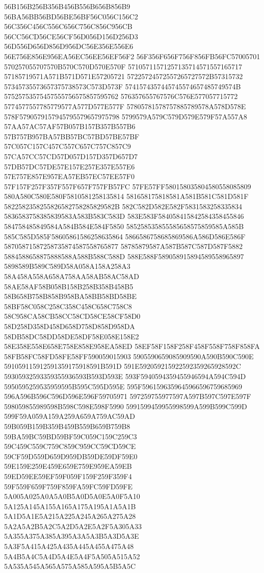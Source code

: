56B156B256B356B456B556B656B856B9
56BA56BB56BD56BE56BF56C056C156C2
56C356C456C556C656C756C856C956CB
56CC56CD56CE56CF56D056D156D256D3
56D556D656D856D956DC56E356E556E6
56E756E856E956EA56EC56EE56EF56F2
56F356F656F756F856FB56FC57005701
570257055707570B570C570D570E570F
57105711571257135714571557165717
57185719571A571B571D571E57205721
57225724572557265727572B57315732
57345735573657375738573C573D573F
5741574357445745574657485749574B
57525753575457555756575857595762
576357655767576C576E577057715772
5774577557785779577A577D577E577F
57805781578757885789578A578D578E
578F5790579157945795579657975798
5799579A579C579D579E579F57A557A8
57AA57AC57AF57B057B157B357B557B6
57B757B957BA57BB57BC57BD57BE57BF
57C057C157C457C557C657C757C857C9
57CA57CC57CD57D057D157D357D657D7
57DB57DC57DE57E157E257E357E557E6
57E757E857E957EA57EB57EC57EE57F0
57F157F257F357F557F657F757FB57FC
57FE57FF580158035804580558085809
580A580C580E580F5810581258135814
581658175818581A581B581C581D581F
5822582358255826582758285829582B
582C582D582E582F5831583258335834
5836583758385839583A583B583C583D
583E583F584058415842584358455846
584758485849584A584B584E584F5850
585258535855585658575859585A585B
585C585D585F58605861586258635864
5866586758685869586A586D586E586F
58705871587258735874587558765877
58785879587A587B587C587D587F5882
5884588658875888588A588B588C588D
588E588F589058915894589558965897
5898589B589C589D58A058A158A258A3
58A458A558A658A758AA58AB58AC58AD
58AE58AF58B058B158B258B358B458B5
58B658B758B858B958BA58BB58BD58BE
58BF58C058C258C358C458C658C758C8
58C958CA58CB58CC58CD58CE58CF58D0
58D258D358D458D658D758D858D958DA
58DB58DC58DD58DE58DF58E058E158E2
58E358E558E658E758E858E958EA58ED
58EF58F158F258F458F558F758F858FA
58FB58FC58FD58FE58FF590059015903
5905590659085909590A590B590C590E
591059115912591359175918591B591D
591E592059215922592359265928592C
59305932593359355936593B593D593E
593F5940594359455946594A594C594D
5950595259535959595B595C595D595E
595F5961596359645966596759685969
596A596B596C596D596E596F59705971
597259755977597A597B597C597E597F
598059855989598B598C598E598F5990
5991599459955998599A599B599C599D
599F59A059A159A259A659A759AC59AD
59B059B159B359B459B559B659B759B8
59BA59BC59BD59BF59C059C159C259C3
59C459C559C759C859C959CC59CD59CE
59CF59D559D659D959DB59DE59DF59E0
59E159E259E459E659E759E959EA59EB
59ED59EE59EF59F059F159F259F359F4
59F559F659F759F859FA59FC59FD59FE
5A005A025A0A5A0B5A0D5A0E5A0F5A10
5A125A145A155A165A175A195A1A5A1B
5A1D5A1E5A215A225A245A265A275A28
5A2A5A2B5A2C5A2D5A2E5A2F5A305A33
5A355A375A385A395A3A5A3B5A3D5A3E
5A3F5A415A425A435A445A455A475A48
5A4B5A4C5A4D5A4E5A4F5A505A515A52
5A535A545A565A575A585A595A5B5A5C
